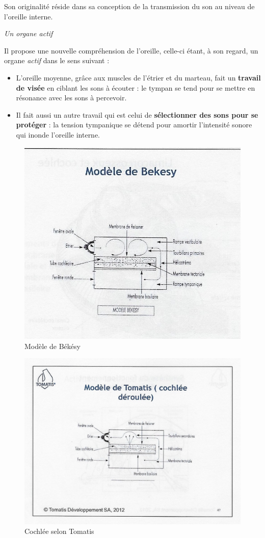 Son originalité réside dans sa conception de la transmission du son
au niveau de l'oreille interne. 

\emph{Un organe actif}

Il propose une nouvelle compréhension de l'oreille, celle-ci étant,
à son regard, un organe \emph{actif} %
dans le sens suivant :
\begin{itemize}
	\item L'oreille moyenne, grâce aux muscles de l'étrier et du marteau, 
fait
		un\textbf{ travail de visée} en ciblant les sons à écouter : le tympan 
se tend
		pour se mettre en résonance avec les sons à percevoir.
	\item Il fait aussi un autre travail qui est celui de \textbf{sélectionner des 
sons
		pour se protéger} : la tension tympanique se détend pour amortir 
l'intensité
		sonore qui inonde l'oreille interne. 
\end{itemize}




\begin{figure}
	\centering
	\includegraphics[width=0.7\linewidth]{images/Cochleederoule_bas.jpg}
	\caption[Modèle de Békésy]{Modèle de Békésy}
	\label{fig:cochleederoulebas}
\end{figure}


 


\begin{figure}
	\centering
	\includegraphics[width=0.7\linewidth]{images/Cochleederoule_haut.jpg}
	\caption[Cochlée selon Tomatis]{Cochlée selon Tomatis}
	\label{fig:cochleederoulehaut}
\end{figure}


